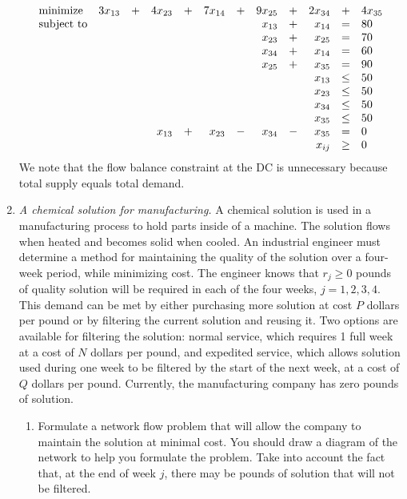 \begin{enumerate}
\begin{solution}
\[
\begin{array}{lrrrrrrrrrrl}
\textrm{minimize} & 3x_{13} &+& 4x_{23} &+& 7x_{14} &+& 9x_{25} &+& 2x_{34} &+& 4x_{35} \\
\textrm{subject to} &&&&&&& x_{13} &+& x_{14} &=& 80\\
&&&&&&& x_{23} &+& x_{25} &=& 70\\
&&&&&&& x_{34} &+& x_{14} &=& 60\\
&&&&&&& x_{25} &+& x_{35} &=& 90\\
&&&&&&&&& x_{13} & \leq & 50\\
&&&&&&&&& x_{23} & \leq & 50\\
&&&&&&&&& x_{34} & \leq & 50\\
&&&&&&&&& x_{35} & \leq & 50\\
&&& x_{13} &+& x_{23} &-& x_{34} &-& x_{35} &=& 0\\
\multicolumn{10}{r}{x_{ij}} & \geq & 0
\end{array}
\]
We note that the flow balance constraint at the DC is unnecessary
because total supply equals total demand.
\end{solution}

\item \emph{A chemical solution for
	manufacturing.}  A chemical solution is used in
a
manufacturing process to hold parts inside of a
machine. The solution flows when heated and
becomes solid when cooled. An industrial
engineer must determine a method for maintaining
the quality of the solution over a four-week
period, while minimizing cost. The engineer knows
that $r_j \geq 0$ pounds of quality solution
will be required in each of the four weeks,
$j = 1, 2, 3, 4$. This demand can be met by
either purchasing more solution at cost $P$ dollars per
pound or by filtering the current solution and
reusing it.  Two options are available for
filtering the solution: normal service, which
requires 1 full week at a cost of $N$ dollars
per pound, and expedited service, which allows
solution used during one week to be filtered
by the start of the next week, at a cost of
$Q$ dollars per pound. Currently, the
manufacturing company has zero pounds of
solution.

\begin{enumerate}
	\item  Formulate a network flow problem that
	will allow the company to maintain the solution
	at minimal cost.  You should draw a diagram of
	the network to help you formulate the problem.
	Take into account the
	fact that, at the end of week $j$, there may
	be pounds of solution that will not be
	filtered.
	

\end{enumerate}
\end{enumerate}
